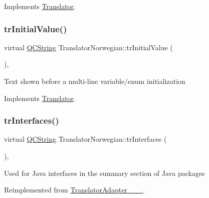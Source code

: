 Implements \mbox{\hyperlink{class_translator}{Translator}}.

\mbox{\label{class_translator_norwegian_a0599a31dcae83d35b8ca12d6c77adf2a}} 
\subsubsection{\texorpdfstring{trInitialValue()}{trInitialValue()}}
{\footnotesize\ttfamily virtual \mbox{\hyperlink{class_q_c_string}{Q\+C\+String}} Translator\+Norwegian\+::tr\+Initial\+Value (\begin{DoxyParamCaption}{ }\end{DoxyParamCaption})\hspace{0.3cm}{\ttfamily [inline]}, {\ttfamily [virtual]}}

Text shown before a multi-\/line variable/enum initialization 

Implements \mbox{\hyperlink{class_translator}{Translator}}.

\mbox{\label{class_translator_norwegian_af6584d5199bcba69b0ae9d2000456159}} 
\subsubsection{\texorpdfstring{trInterfaces()}{trInterfaces()}}
{\footnotesize\ttfamily virtual \mbox{\hyperlink{class_q_c_string}{Q\+C\+String}} Translator\+Norwegian\+::tr\+Interfaces (\begin{DoxyParamCaption}{ }\end{DoxyParamCaption})\hspace{0.3cm}{\ttfamily [inline]}, {\ttfamily [virtual]}}

Used for Java interfaces in the summary section of Java packages 

Reimplemented from \mbox{\hyperlink{class_translator_adapter__1__8__4}{Translator\+Adapter\+\_\+\_\+\_}}.

\mbox{\label{class_translator_norwegian_a16488d8710c0fcdb2866f260bdc9bb3f}} 
